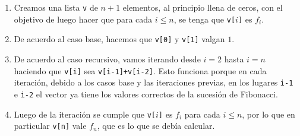 \documentclass[a4paper, 12pt]{report}
\theoremstyle{definition}
\begin{document}
\begin{enumerate}
	\item Creamos una lista {\tt v} de $n+1$ elementos, al principio llena de ceros, con el objetivo de luego hacer que para cada $i\leq n$, se tenga que {\tt v[$i$]} es $f_i$.
	\item De acuerdo al caso base, hacemos que {\tt v[0]} y {\tt v[1]} valgan $1$.
	\item De acuerdo al caso recursivo, vamos iterando desde $i=2$ hasta $i=n$ haciendo que {\tt v[i]} sea {\tt v[i-1]+v[i-2]}. Esto funciona porque en cada iteración, debido a los casos base y las iteraciones previas, en los lugares {\tt i-1} e {\tt i-2} el vector ya tiene los valores correctos de la sucesión de Fibonacci.
	\item Luego de la iteración se cumple que {\tt v[$i$]} es $f_i$ para cada $i\leq n$, por lo que en particular {\tt v[n]} vale $f_n$, que es lo que se debía calcular.
\end{enumerate}
\end{document}
